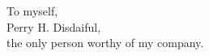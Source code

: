 \begin{dedication}
\null\vfil
{\large
\begin{center}
To myself,\\\vspace{12pt}
Perry H. Disdaiful,\\\vspace{12pt}
the only person worthy of my company.
\end{center}}
\vfil\null
\end{dedication}
